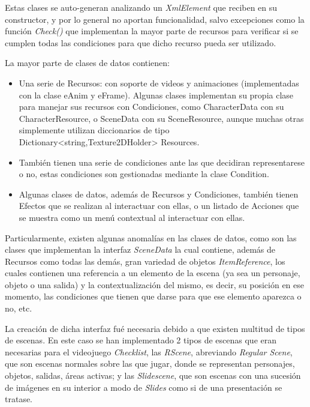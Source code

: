 Estas clases se auto-generan analizando un \textit{XmlElement} que reciben en su constructor, y por lo general no aportan funcionalidad, salvo excepciones como la función \textit{Check()} que implementan la mayor parte de recursos para verificar si se cumplen todas las condiciones para que dicho recurso pueda ser utilizado.

La mayor parte de clases de datos contienen:
\begin{itemize}
	\item Una serie de Recursos: con soporte de videos y animaciones (implementadas con la clase eAnim y eFrame). Algunas clases implementan su propia clase para manejar sus recursos con Condiciones, como CharacterData con su CharacterResource, o SceneData con su SceneResource, aunque muchas otras simplemente utilizan diccionarios de tipo Dictionary<string,Texture2DHolder> Resources.
	
	\item También tienen una serie de condiciones ante las que decidiran representarese o no, estas condiciones son gestionadas mediante la clase Condition.
	
	\item Algunas clases de datos, además de Recursos y Condiciones, también tienen Efectos que se realizan al interactuar con ellas, o un listado de Acciones que se muestra como un menú contextual al interactuar con ellas.
\end{itemize}

Particularmente, existen algunas anomalías en las clases de datos, como son las clases que implementan la interfaz \textit{SceneData} la cual contiene, además de Recursos como todas las demás, gran variedad de objetos \textit{ItemReference}, los cuales contienen una referencia a un elemento de la escena (ya sea un personaje, objeto o una salida) y la contextualización del mismo, es decir, su posición en ese momento, las condiciones que tienen que darse para que ese elemento aparezca o no, etc.

La creación de dicha interfaz fué necesaria debido a que existen multitud de tipos de escenas. En este caso se han implementado 2 tipos de escenas que eran necesarias para el videojuego \textit{Checklist}, las \textit{RScene}, abreviando \textit{Regular Scene}, que son escenas normales sobre las que jugar, donde se representan personajes, objetos, salidas, áreas activas; y las \textit{Slidescene}, que son escenas con una sucesión de imágenes en su interior a modo de \textit{Slides} como si de una presentación se tratase.

